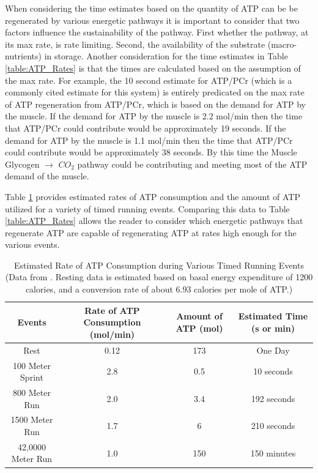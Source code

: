 When considering the time estimates based on the quantity of ATP can be be regenerated by various energetic pathways it is important to consider that two factors influence the sustainability of the pathway. First whether the pathway, at its max rate, is rate limiting. Second, the availability of the substrate (macro-nutrients) in storage. Another consideration for the time estimates in Table \ref{table:ATP_Rates} is that the times are calculated based on the assumption of the max rate. For example, the 10 second estimate for ATP/PCr (which is a commonly cited estimate for this system) is entirely predicated on the max rate of ATP regeneration from ATP/PCr, which is based on the demand for ATP by the muscle. If the demand for ATP by the muscle is 2.2 mol/min then the time that ATP/PCr could contribute would be approximately 19 seconds. If the demand for ATP by the muscle is 1.1 mol/min then the time that ATP/PCr could contribute would be approximately 38 seconds. By this time the Muscle Glycogen $\rightarrow$ $CO_2$ pathway could be contributing and meeting most of the ATP demand of the muscle. 


Table \ref{table:Event_ATP_Rates} provides estimated rates of ATP consumption and the amount of ATP utilized for a variety of timed running events. Comparing this data to Table \ref{table:ATP_Rates} allows the reader to consider which energetic pathways that regenerate ATP are capable of regenerating ATP at rates high enough for the various events.


\begin{table}[h!]
\centering
\begin{tabular}{||c c c c||} 
 \hline
Events & Rate of ATP Consumption (mol/min) & Amount of ATP (mol) & Estimated Time (s or min)\\ [0.5ex] 
 \hline\hline
 Rest & 0.12  & 173 & One Day \\
 100 Meter Sprint & 2.8 & 0.5 & 10 seconds \\ 
 800 Meter Run & 2.0 & 3.4 & 192 seconds\\
 1500 Meter Run & 1.7 & 6 & 210 seconds \\ 
 42,0000 Meter Run & 1.0 & 150 & 150 minutes \\[1ex] 
 \hline
\end{tabular}
\caption{Estimated Rate of ATP Consumption during Various Timed Running Events (\footnotesize{Data from \cite{feher_quantitative_2017}. Resting data is estimated based on basal energy expenditure of 1200 calories, and a conversion rate of about 6.93 calories per mole of ATP.})}
\label{table:Event_ATP_Rates}
\end{table}
 
